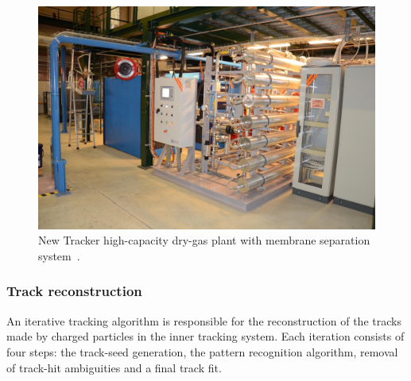 \begin{figure}[htbp]
\begin{minipage}[t]{0.59\textwidth}
    		\includegraphics[width=\textwidth]{2_ExperimentalSetup/Figures/plant}
    		\caption{New Tracker high-capacity dry-gas plant with membrane separation system~\cite{Pralavorio:2024977}.}
    			\label{fig:TrackLS1}
    	\end{minipage}
    
    \end{figure}

\subsubsection*{Track reconstruction}

An iterative tracking algorithm is responsible for the reconstruction of the tracks made by charged particles in the inner tracking system. Each iteration consists of four steps\cite{Bayatian:922757}: the track-seed generation, the pattern recognition algorithm, removal of track-hit ambiguities and a final track fit. 

